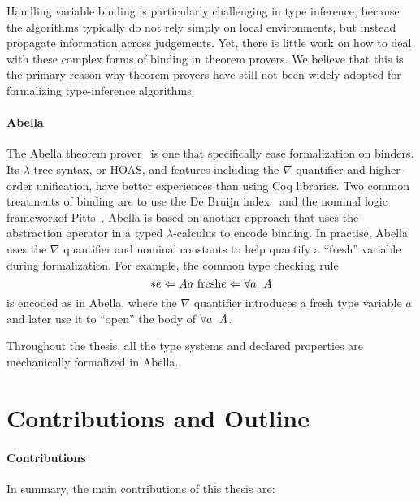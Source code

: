 Handling variable binding is particularly challenging in type inference,
because the algorithms typically do not rely simply on local environments, but
instead propagate information across judgements. Yet, there is little work on
how to deal with these complex forms of binding in theorem provers. We believe
that this is the primary reason why theorem provers have still not been widely
adopted for formalizing type-inference algorithms.

\paragraph{Abella}
The Abella theorem prover~\citep{AbellaDesc} is one that specifically ease
formalization on binders.
Its $\lambda$-tree syntax, or HOAS, and features including the $\nabla$ quantifier
and higher-order unification, have better experiences than using Coq libraries.
Two common treatments of binding are to use the De Bruijn index~\citep{DEBRUIJN1972381}
and the nominal logic frameworkof Pitts~\citep{PITTS2003165}.
Abella is based on another approach that uses the abstraction operator in a typed
$\lambda$-calculus to encode binding.
In practise, Abella uses the $\nabla$ quantifier and nominal constants to help
quantify a ``fresh'' variable during formalization.
For example, the common type checking rule
$$\inferrule*{e \Lto A \\ a \text{ fresh}}{e \Lto \all A}$$
is encoded as
in Abella, where the $\nabla$ quantifier introduces a fresh type variable $a$
and later use it to ``open'' the body of $\all A$.

Throughout the thesis, all the type systems and declared properties are
mechanically formalized in Abella.



\section{Contributions and Outline}

\paragraph{Contributions}
In summary, the main contributions of this thesis are:


